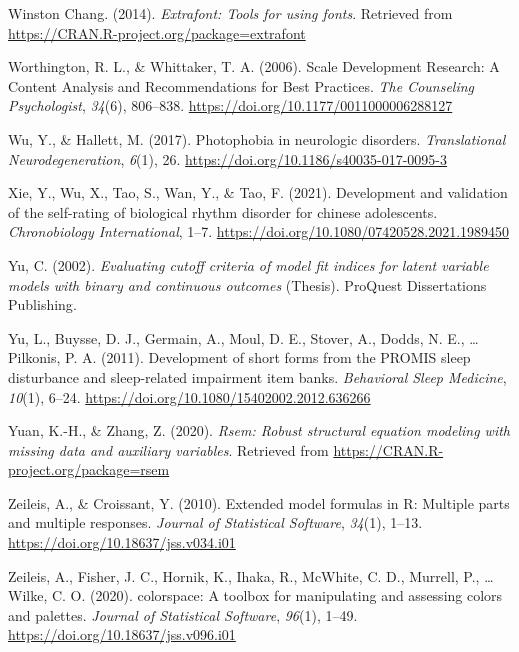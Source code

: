 \documentclass[
  english,
  man]{apa6}
\newlength{\cslhangindent}
\newlength{\cslentryspacingunit} %
\newenvironment{CSLReferences}[2] %
 {%
  \setlength{\parindent}{0pt}
  \ifodd #1
  \let\oldpar\par
  \def\par{\hangindent=\cslhangindent\oldpar}
  \fi
  \setlength{\parskip}{#2\cslentryspacingunit}
 }%
 {}
\begin{document}
\begin{CSLReferences}{1}{0}
\leavevmode{}%
Winston Chang. (2014). \emph{Extrafont: Tools for using fonts}. Retrieved from \url{https://CRAN.R-project.org/package=extrafont}

\leavevmode{}%
Worthington, R. L., \& Whittaker, T. A. (2006). Scale {Development Research}: {A Content Analysis} and {Recommendations} for {Best Practices}. \emph{The Counseling Psychologist}, \emph{34}(6), 806--838. \url{https://doi.org/10.1177/0011000006288127}

\leavevmode{}%
Wu, Y., \& Hallett, M. (2017). Photophobia in neurologic disorders. \emph{Translational Neurodegeneration}, \emph{6}(1), 26. \url{https://doi.org/10.1186/s40035-017-0095-3}

\leavevmode{}%
Xie, Y., Wu, X., Tao, S., Wan, Y., \& Tao, F. (2021). Development and validation of the self-rating of biological rhythm disorder for chinese adolescents. \emph{Chronobiology International}, 1--7. \url{https://doi.org/10.1080/07420528.2021.1989450}

\leavevmode{}%
Yu, C. (2002). \emph{Evaluating cutoff criteria of model fit indices for latent variable models with binary and continuous outcomes} (Thesis). {ProQuest Dissertations Publishing}.

\leavevmode{}%
Yu, L., Buysse, D. J., Germain, A., Moul, D. E., Stover, A., Dodds, N. E., \ldots{} Pilkonis, P. A. (2011). Development of short forms from the PROMIS{\texttrademark} sleep disturbance and sleep-related impairment item banks. \emph{Behavioral Sleep Medicine}, \emph{10}(1), 6--24. \url{https://doi.org/10.1080/15402002.2012.636266}

\leavevmode{}%
Yuan, K.-H., \& Zhang, Z. (2020). \emph{Rsem: Robust structural equation modeling with missing data and auxiliary variables}. Retrieved from \url{https://CRAN.R-project.org/package=rsem}

\leavevmode{}%
Zeileis, A., \& Croissant, Y. (2010). Extended model formulas in {R}: Multiple parts and multiple responses. \emph{Journal of Statistical Software}, \emph{34}(1), 1--13. \url{https://doi.org/10.18637/jss.v034.i01}

\leavevmode{}%
Zeileis, A., Fisher, J. C., Hornik, K., Ihaka, R., McWhite, C. D., Murrell, P., \ldots{} Wilke, C. O. (2020). {colorspace}: A toolbox for manipulating and assessing colors and palettes. \emph{Journal of Statistical Software}, \emph{96}(1), 1--49. \url{https://doi.org/10.18637/jss.v096.i01}


\end{CSLReferences}
\end{document}
